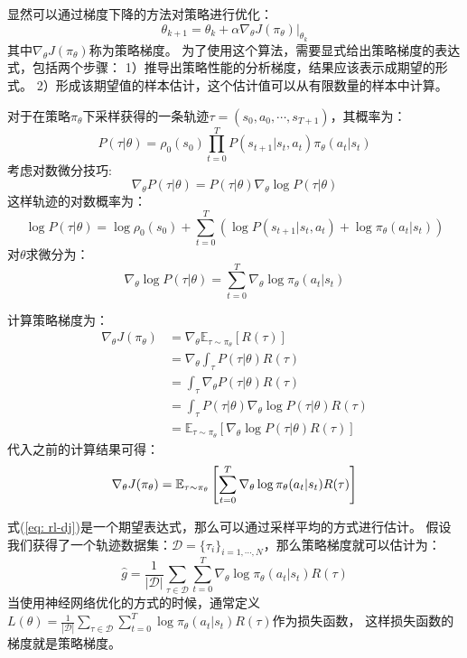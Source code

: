 显然可以通过梯度下降的方法对策略进行优化：
\begin{equation*}
    \theta_{k+1} = \theta_k + \alpha \nabla_\theta J(\pi_\theta)|_{\theta_k}
\end{equation*}
其中$\nabla_\theta J(\pi_\theta)$称为策略梯度。
为了使用这个算法，需要显式给出策略梯度的表达式，包括两个步骤：
1）推导出策略性能的分析梯度，结果应该表示成期望的形式。
2）形成该期望值的样本估计，这个估计值可以从有限数量的样本中计算。

对于在策略$\pi_\theta$下采样获得的一条轨迹$\tau = (s_0, a_0, \cdots, s_{T+1})$，其概率为：
\begin{equation*}
    P(\tau|\theta) = \rho_0(s_0) \prod_{t=0}^{T} P(s_{t+1}|s_t, a_t)\pi_\theta(a_t|s_t)
\end{equation*}
考虑对数微分技巧:
\begin{equation*}
    \nabla_\theta P(\tau|\theta) = P(\tau|\theta)\nabla_\theta \log P(\tau|\theta)
\end{equation*}
这样轨迹的对数概率为：
\begin{equation*}
    \log P(\tau|\theta) = \log \rho_0(s_0) + \sum_{t=0}^T \left( \log P(s_{t+1}|s_t,a_t) + \log \pi_\theta (a_t|s_t) \right) 
\end{equation*}
对$\theta$求微分为：
\begin{equation*}
    \nabla_\theta \log P(\tau|\theta) = \sum_{t=0}^T \nabla_\theta \log \pi_\theta(a_t|s_t)
\end{equation*}

计算策略梯度为：
\begin{align*}
    \nabla_\theta J(\pi_\theta) &= \nabla_\theta \mathbb{E}_{\tau\sim\pi_\theta}[R(\tau)] \\
    &= \nabla_\theta \int_\tau P(\tau|\theta)R(\tau) \\
    &= \int_\tau \nabla_\theta P(\tau|\theta)R(\tau) \\
    &= \int_\tau P(\tau|\theta) \nabla_\theta \log P(\tau|\theta)R(\tau) \\
    &= \mathbb{E}_{\tau\sim\pi_\theta}\left[\nabla_\theta \log P(\tau|\theta)R(\tau)\right]
\end{align*}
代入之前的计算结果可得：
\begin{equation}{\label{eq: rl-dj}}
    \nabla_\theta J(\pi_\theta) = \mathbb{E}_{\tau\sim\pi_\theta} \left[ \sum_{t=0}^{T} \nabla_\theta \log \pi_\theta(a_t|s_t) R(\tau) \right]
\end{equation}

式(\ref{eq: rl-dj})是一个期望表达式，那么可以通过采样平均的方式进行估计。
假设我们获得了一个轨迹数据集：$\mathcal{D}=\{\tau_i\}_{i=1,\cdots,N}$，那么策略梯度就可以估计为：
\begin{equation*}
    \hat{g} = \frac{1}{|\mathcal{D}|}\sum_{\tau\in\mathcal{D}}\sum_{t=0}^T \nabla_\theta \log \pi_\theta(a_t|s_t)R(\tau)
\end{equation*}
当使用神经网络优化的方式的时候，通常定义$L(\theta) =\frac{1}{|\mathcal{D}|} \sum_{\tau\in\mathcal{D}}\sum_{t=0}^T \log \pi_\theta(a_t|s_t)R(\tau)$作为损失函数，
这样损失函数的梯度就是策略梯度。

